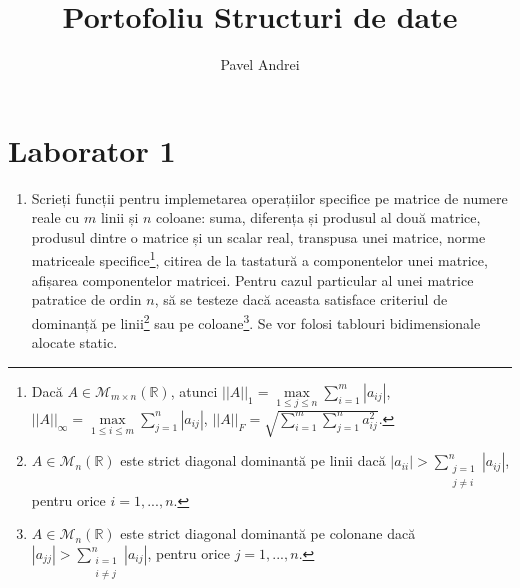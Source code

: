 \documentclass[11pt,a4paper]{article}
\author{Pavel Andrei}
\date{}
\title{Portofoliu Structuri de date}
\newenvironment{problema}[1][1]{
  \begin{enumerate}[leftmargin=*]
    \setcounter{enumi}{#1-1}
    \item 
}{
\end{enumerate}
}
\newcommand{\mat}[1]{\mathcal{M}_{#1}(\mathbb{R})}
\newcommand{\matmn}{\mat{m\times{}n}}
\newcommand{\matn}{\mat{n}}
\begin{document}
\section*{Laborator 1}
  \begin{problema}[16]
    Scrieți funcții pentru implemetarea operațiilor specifice pe matrice de numere reale cu $m$ linii și $n$ coloane:
    suma, diferența și produsul al două matrice, produsul dintre o matrice și un scalar real, transpusa unei matrice, norme matriceale specifice\footnote{
      Dacă $A \in \matmn$, atunci
      $||A||_1 = \max\limits_{1\leq j \leq n} \sum\limits_{i=1}^m |a_{ij}|$,
      $||A||_\infty = \max\limits_{1 \leq i \leq m} \sum\limits_{j=1}^{n}|a_{ij}|$,
      $||A||_{F} = \sqrt{\sum\limits_{i=1}^{m} \sum\limits_{j=1}^{n} a_{ij}^{2} }$.
    },
    citirea de la tastatură a componentelor unei matrice, afișarea componentelor matricei.
    Pentru cazul particular al unei matrice patratice de ordin $n$, să se testeze dacă aceasta satisface criteriul de dominanță pe linii\footnote{
      $A \in \matn$ este strict diagonal dominantă pe linii dacă
      $|a_{ii}| > \sum\limits_{
        \substack{
          j = 1 \\
          j \ne i
        }
      }^{n}
      |a_{ij}|$, pentru orice $i = 1,...,n$.
    } sau pe coloane\footnote{
      $A \in \matn$ este strict diagonal dominantă pe colonane dacă
      $|a_{jj}| > \sum\limits_{
        \substack{
          i = 1 \\
          i \ne j
        }
      }^{n}
      |a_{ij}|$, pentru orice $j = 1,...,n$.
    }.
    Se vor folosi tablouri bidimensionale alocate static.
  
  \end{problema}
  
\end{document}
